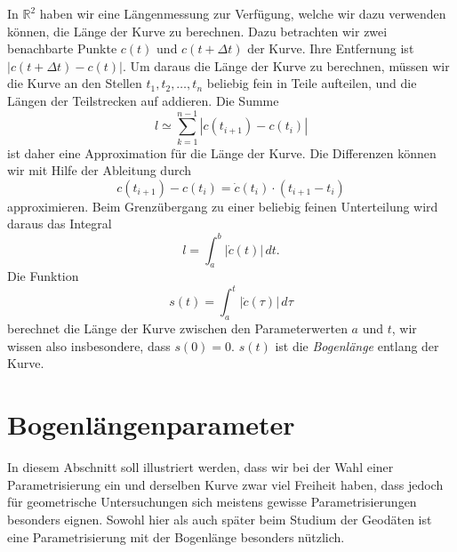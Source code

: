 In $\mathbb R^2$ haben wir eine Längenmessung zur Verfügung, welche
wir dazu verwenden können, die Länge der Kurve zu berechnen.
Dazu betrachten wir zwei benachbarte Punkte $c(t)$ und $c(t+\Delta t)$
der Kurve.
Ihre Entfernung ist $|c(t+\Delta t) - c(t)|$.
Um daraus die Länge der Kurve zu berechnen, müssen wir die Kurve
an den Stellen $t_1,t_2,\dots,t_n$
beliebig fein in Teile aufteilen, und die Längen der Teilstrecken
auf addieren.
Die Summe
\[
l\simeq\sum_{k=1}^{n-1} |c(t_{i+1})-c(t_i)|
\]
ist daher eine Approximation für die Länge der Kurve.
Die Differenzen können wir mit Hilfe der Ableitung durch
\[
c(t_{i+1})-c(t_i) = \dot c(t_i)\cdot (t_{i+1}-t_i)
\]
approximieren.
Beim Grenzübergang zu einer beliebig feinen Unterteilung wird daraus
das Integral
\begin{equation}
l=\int_a^b |\dot c(t)|\,dt.
\end{equation}
Die Funktion
\begin{equation}
s(t)
=
\int_a^t |\dot c(\tau)|\,d\tau
\end{equation}
berechnet die Länge der Kurve zwischen den Parameterwerten
$a$ und $t$, wir wissen also insbesondere, dass $s(0)=0$.
$s(t)$ ist die {\em Bogenlänge} entlang der Kurve.

\section{Bogenlängenparameter}
In diesem Abschnitt soll illustriert werden, dass wir bei der Wahl
einer Parametrisierung ein und derselben Kurve zwar viel Freiheit haben,
dass jedoch für geometrische Untersuchungen sich meistens gewisse
Parametrisierungen besonders eignen.
Sowohl hier als auch später beim Studium der Geodäten ist eine
Parametrisierung mit der Bogenlänge besonders nützlich.

